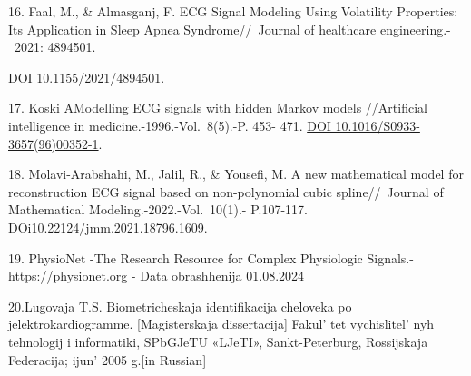 \begin{references}
16. Faal, M., \& Almasganj, F. ECG Signal Modeling Using Volatility
Properties: Its Application in Sleep Apnea Syndrome//~Journal of
healthcare engineering.-~2021: 4894501.

\href{https://doi.org/10.1155/2021/4894501}{DOI 10.1155/2021/4894501}.

17. Koski AModelling ECG signals with hidden Markov models //Artificial
intelligence in medicine.-1996.-Vol.~8(5).-P. 453- 471.
\href{https://doi.org/10.1016/S0933-3657(96)00352-1}{DOI
10.1016/S0933-3657(96)00352-1}.

18. Molavi-Arabshahi, M., Jalil, R., \& Yousefi, M. A new mathematical
model for reconstruction ECG signal based on non-polynomial cubic
spline//~Journal of Mathematical Modeling.-2022.-Vol.~10(1).- P.107-117.
DOi10.22124/jmm.2021.18796.1609.

19. PhysioNet -The Research Resource for Complex Physiologic Signals.-
\href{https://physionet.org}{https://physionet.org} - Data obrashhenija 01.08.2024

20.Lugovaja T.S. Biometricheskaja identifikacija cheloveka po
jelektrokardiogramme. {[}Magisterskaja dissertacija{]}
Fakul' tet vychislitel' nyh tehnologij i
informatiki, SPbGJeTU «LJeTI», Sankt-Peterburg, Rossijskaja Federacija;
ijun'{} 2005 g.{[}in Russian{]}
\end{references}

